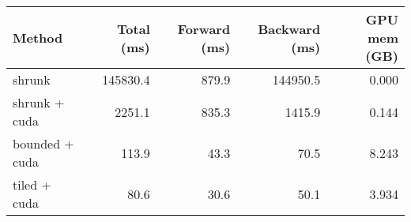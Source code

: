 \begin{tabular}{lrrrr}
\hline
 Method         &   Total (ms) &   Forward (ms) &   Backward (ms) &   GPU mem (GB) \\
\hline
 shrunk         &     145830.4 &          879.9 &        144950.5 &          0.000 \\
 shrunk + cuda  &       2251.1 &          835.3 &          1415.9 &          0.144 \\
 bounded + cuda &        113.9 &           43.3 &            70.5 &          8.243 \\
 tiled + cuda   &         80.6 &           30.6 &            50.1 &          3.934 \\
\hline
\end{tabular}
